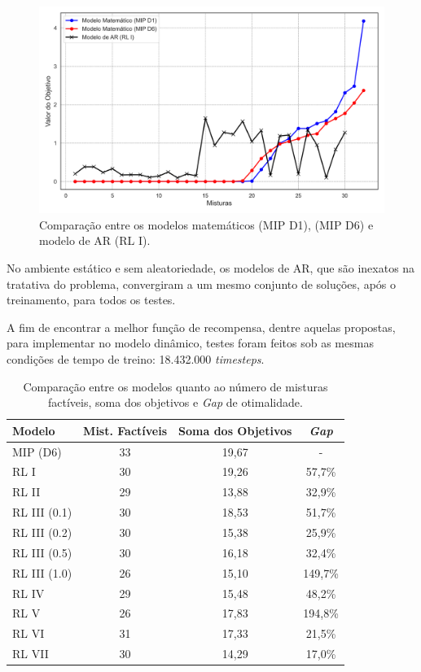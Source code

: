\documentclass[
    12pt,                %
    openright,           %
    oneside,             %
    a4paper,             %
    english,             %
    spanish,             %
    brazil               %
]{ufscar}
\begin{document}
\begin{figure}[hbt]
\centering
  \caption{Comparação entre os modelos matemáticos (MIP D1), (MIP D6) e modelo de AR (RL I).} 
  \label{figure:DiscD1D6RLI}
  \includegraphics[width=1\textwidth]{figures/MIPD1D6RL1.png}
\end{figure}

No ambiente estático e sem aleatoriedade, os modelos de AR, que são inexatos na tratativa do problema, convergiram a um mesmo conjunto de soluções, após o treinamento, para todos os testes.

A fim de encontrar a melhor função de recompensa, dentre aquelas propostas, para implementar no modelo dinâmico, testes foram feitos sob as mesmas condições de tempo de treino: 18.432.000 \textit{timesteps}.

\begin{table}[htp]
    \centering
    \caption{Comparação entre os modelos quanto ao número de misturas factíveis, soma dos objetivos e \textit{Gap} de otimalidade.}
    \begin{tabular}{l c c c}
    \toprule
    Modelo & Mist. Factíveis & Soma dos Objetivos & \textit{Gap} \\
    \midrule
    MIP (D6)        & 33 & 19,67  & -       \\
    RL I            & 30 & 19,26  & 57,7\%  \\
    RL II           & 29 & 13,88  & 32,9\%  \\
    RL III (0.1)    & 30 & 18,53  & 51,7\%  \\
    RL III (0.2)    & 30 & 15,38  & 25,9\%  \\
    RL III (0.5)    & 30 & 16,18  & 32,4\%  \\
    RL III (1.0)    & 26 & 15,10  & 149,7\% \\
    RL IV           & 29 & 15,48  & 48,2\%  \\
    RL V            & 26 & 17,83  & 194,8\% \\
    RL VI           & 31 & 17,33  & 21,5\%  \\
    RL VII          & 30 & 14,29  & 17,0\%  \\
    \bottomrule
    \end{tabular}
    \label{tab:comparacao_rl}
\end{table}
\end{document}
